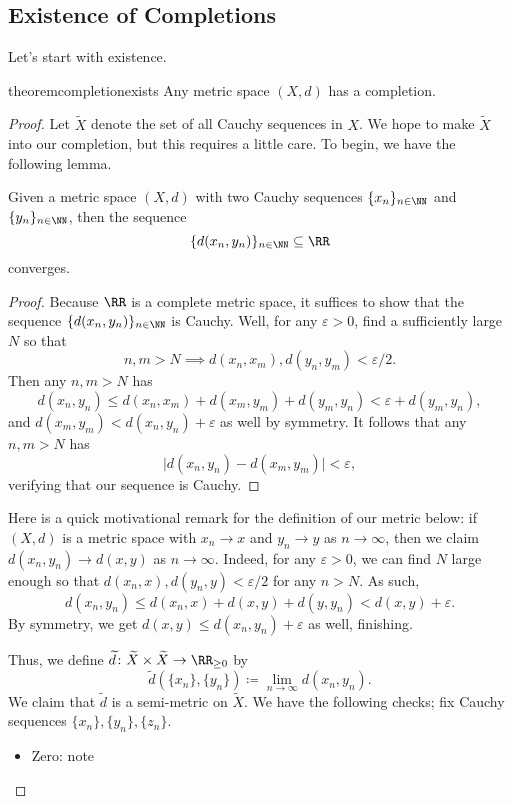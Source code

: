 \documentclass[../notes.tex]{subfiles}
\begin{document}
\subsection{Existence of Completions}
Let's start with existence.
\begin{restatable}{theorem}{completionexists} \label{thm:completionexists}
	Any metric space $(X,d)$ has a completion.
\end{restatable}
\begin{proof}
	Let $\widetilde X$ denote the set of all Cauchy sequences in $X$. We hope to make $\widetilde X$ into our completion, but this requires a little care. To begin, we have the following lemma.
	\begin{lemma}
		Given a metric space $(X,d)$ with two Cauchy sequences $\{x_n\}_{n\in\NN}$ and $\{y_n\}_{n\in\NN}$, then the sequence
		\[\{d(x_n,y_n)\}_{n\in\NN}\subseteq\RR\]
		converges.
	\end{lemma}
	\begin{proof}
		Because $\RR$ is a complete metric space, it suffices to show that the sequence $\{d(x_n,y_n)\}_{n\in\NN}$ is Cauchy. Well, for any $\varepsilon>0$, find a sufficiently large $N$ so that
		\[n,m>N\implies d(x_n,x_m),d(y_n,y_m)<\varepsilon/2.\]
		Then any $n,m>N$ has
		\[d(x_n,y_n)\le d(x_n,x_m)+d(x_m,y_m)+d(y_m,y_n)<\varepsilon+d(y_m,y_n),\]
		and $d(x_m,y_m)<d(x_n,y_n)+\varepsilon$ as well by symmetry. It follows that any $n,m>N$ has
		\[\big|d(x_n,y_n)-d(x_m,y_m)\big|<\varepsilon,\]
		verifying that our sequence is Cauchy.
	\end{proof}
	\begin{remark} \label{rem:metriciscont}
		Here is a quick motivational remark for the definition of our metric below: if $(X,d)$ is a metric space with $x_n\to x$ and $y_n\to y$ as $n\to\infty$, then we claim $d(x_n,y_n)\to d(x,y)$ as $n\to\infty$. Indeed, for any $\varepsilon>0$, we can find $N$ large enough so that $d(x_n,x),d(y_n,y)<\varepsilon/2$ for any $n>N$. As such,
		\[d(x_n,y_n)\le d(x_n,x)+d(x,y)+d(y,y_n)<d(x,y)+\varepsilon.\]
		By symmetry, we get $d(x,y)\le d(x_n,y_n)+\varepsilon$ as well, finishing.
	\end{remark}
	Thus, we define $\widetilde d\colon\widetilde X\times\widetilde X\to\RR_{\ge0}$ by
	\[\widetilde d\left(\{x_n\},\{y_n\}\right)\coloneqq\lim_{n\to\infty}d(x_n,y_n).\]
	We claim that $\widetilde d$ is a semi-metric on $\widetilde X$. We have the following checks; fix Cauchy sequences $\{x_n\},\{y_n\},\{z_n\}$.
	\begin{itemize}
		\item Zero: note

\end{itemize}
\end{proof}
\end{document}
